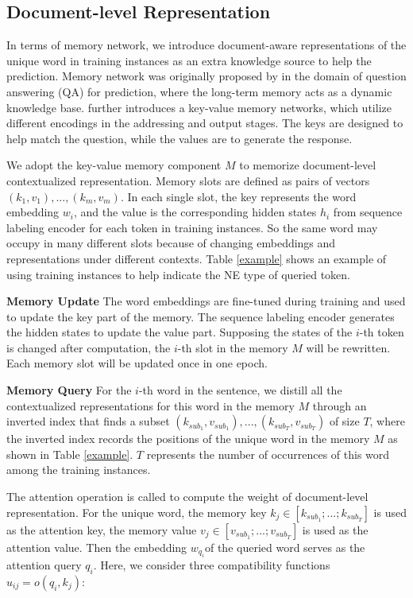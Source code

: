 \documentclass[letterpaper]{article} \usepackage{aaai20}  \usepackage{times}  \usepackage{helvet} \usepackage{courier}  \usepackage[hyphens]{url}  \usepackage{graphicx} \urlstyle{rm} \def\UrlFont{\rm}  \usepackage{graphicx}  \frenchspacing  \setlength{\pdfpagewidth}{8.5in}  \setlength{\pdfpageheight}{11in}
\begin{document}
 
\subsection{Document-level Representation} 

In terms of memory network, we introduce document-aware representations of the unique word in training instances as an extra knowledge source to help the prediction.  Memory network was originally proposed by \cite{weston2014memory} in the domain of question answering (QA) for prediction, where the long-term memory acts as a dynamic knowledge base.
\cite{miller2016key} further introduces a key-value memory networks, which utilize different encodings in the addressing and output stages. The keys are designed to help match the question, while the values are to generate the response. 

We adopt the key-value memory component $\textit{M}$  to memorize document-level contextualized representation. 
Memory slots are defined as pairs of vectors $(k_1, v_1),. . . ,(k_m, v_m)$.
In each single slot, the key represents the word embedding $w_i$, and the value is the corresponding hidden states $h_i$ from sequence labeling encoder for each token in training instances. So the same word may occupy in many different slots because of changing embeddings and representations under different contexts.
Table \ref{example} shows an example of using training instances to help indicate the NE type of queried token.

\noindent\textbf{Memory Update} 
The word embeddings are fine-tuned during training and used to update the key part of the memory. The sequence labeling encoder generates the hidden states to update the value part. Supposing the states of the $i$-th token is changed after computation, the $i$-th slot in the memory $M$ will be rewritten.
Each memory slot will be updated once in one epoch.

\noindent\textbf{Memory Query} 
For the $i$-th word in the sentence, we distill all the contextualized representations for this word in the memory $M$ through an inverted index that finds a subset $(k_{sub_1},v_{sub_1}), ..., (k_{sub_T}, v_{sub_T})$ of size $T$, where the inverted index records the positions of the unique word in the memory $M$ as shown in Table \ref{example}. $T$ represents the number of occurrences of this word among the training instances.

The attention operation is called to compute the weight of document-level representation. For the unique word, the memory key $k_j \in [k_{sub_1}; ...; k_{sub_T}]$ is used as the attention key, the memory value $v_j \in [v_{sub_1}; ...; v_{sub_T}]$ is used as the attention value. Then the embedding $w_{q_i}$of the queried word serves as the attention query $q_i$. Here, we consider three compatibility functions $u_{ij} = o(q_i, k_j)$:
\end{document}
